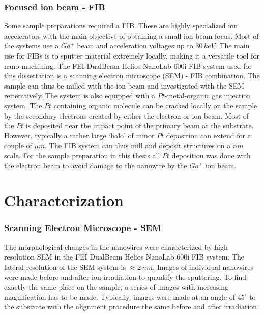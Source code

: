  

\subsubsection{Focused ion beam - FIB}

Some sample preparations required a FIB. These are highly specialized ion accelerators with the main objective of obtaining a small ion beam focus. Most of the systems use a $Ga^+$ beam and acceleration voltages up to $30\,keV$. The main use for FIBs is to sputter material extremely locally, making it a versatile tool for nano-machining. The FEI DualBeam Helios NanoLab 600i FIB system used for this dissertation is a scanning electron microscope (SEM) - FIB combination. The sample can thus be milled with the ion beam and investigated with the SEM reiteratively. The system is also equipped with a $Pt$-metal-organic gas injection system. The $Pt$ containing organic molecule can be cracked locally on the sample by the secondary electrons created by either the electron or ion beam. Most of the $Pt$ is deposited near the impact point of the primary beam at the substrate. However, typically a rather large `halo' of minor $Pt$ deposition can extend for a couple of $\mu m$. The FIB system can thus mill and deposit structures on a $nm$ scale. For the sample preparation in this thesis all $Pt$ deposition was done with the electron beam to avoid damage to the nanowire by the $Ga^+$ ion beam.

\section{Characterization}

\subsubsection{Scanning Electron Microscope - SEM}

The morphological changes in the nanowires were characterized by high resolution SEM in the FEI DualBeam Helios NanoLab 600i FIB system. The lateral resolution of the SEM system is $\approx 2\,nm$. Images of individual nanowires were made before and after ion irradiation to quantify the sputtering. To find exactly the same place on the sample, a series of images with increasing magnification has to be made. Typically, images were made at an angle of $45^\circ$ to the substrate with the alignment procedure the same before and after irradiation.

